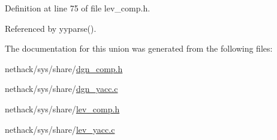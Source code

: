 Definition at line 75 of file lev\+\_\+comp.\+h.



Referenced by yyparse().



The documentation for this union was generated from the following files\+:\begin{DoxyCompactItemize}
\item 
nethack/sys/share/\hyperlink{dgn__comp_8h}{dgn\+\_\+comp.\+h}\item 
nethack/sys/share/\hyperlink{dgn__yacc_8c}{dgn\+\_\+yacc.\+c}\item 
nethack/sys/share/\hyperlink{lev__comp_8h}{lev\+\_\+comp.\+h}\item 
nethack/sys/share/\hyperlink{lev__yacc_8c}{lev\+\_\+yacc.\+c}\end{DoxyCompactItemize}
